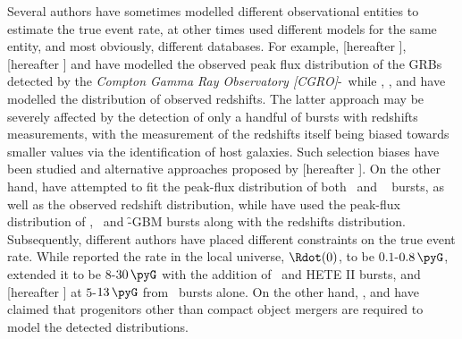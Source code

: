 Several authors have sometimes modelled different observational entities to estimate the true event rate, at other times used different models for the same entity, and most obviously, different databases. For example, \cite{Guetta_and_Piran-2005-A&A} [hereafter ], \cite{Guetta_and_Piran-2006-A&A} [hereafter ] and \cite{Salvaterra_et_al.-2008-MNRAS} have modelled the observed peak flux distribution of the GRBs detected by the \emph{Compton Gamma Ray Observatory [CGRO]}-\B\, while \cite{Hopman_et_al.-2006-ApJ}, \cite{Guetta_and_Stella-2009-A&A}, \cite{Dietz-2011-A&A} and \cite{Petrillo_et_al.-2013-ApJ} have modelled the distribution of observed redshifts. The latter approach may be severely affected by the detection of only a handful of bursts with redshifts measurements, with the measurement of the redshifts itself being biased towards smaller values via the identification of host galaxies. Such selection biases have been studied and alternative approaches proposed by \cite{D'Avanzo_et_al.-2014-MNRAS} [hereafter ]. On the other hand, \cite{Virgili_et_al.-2011-ApJ} have attempted to fit the peak-flux distribution of both \B\ and \s\ \citep{Barthelmy_et_al.-2005-SSRv-SwiftBAT,Gehrels_et_al.-2004-ApJ} bursts, as well as the observed redshift distribution, while \cite{Wanderman_and_Piran-2015-MNRAS} have used the peak-flux distribution of \B, \s\ and \f -GBM \citep{FermiGBM-2009-ApJ} bursts along with the redshifts distribution. Subsequently, different authors have placed different constraints on the true event rate. While  reported the rate in the local universe, $\Rdot(0)$, to be $0.1$-$0.8 \, \pyG$,  extended it to be $8$-$ 30 \, \pyG$ with the addition of \s\ and HETE II bursts, and \cite{Coward_et_al.-2012-MNRAS} [hereafter ] at $5$-$13 \, \pyG$ from \s\ bursts alone. On the other hand, \cite{Salvaterra_et_al.-2008-MNRAS}, \cite{Virgili_et_al.-2011-ApJ} and \cite{Wanderman_and_Piran-2015-MNRAS} have claimed that progenitors other than compact object mergers are required to model the detected distributions.

